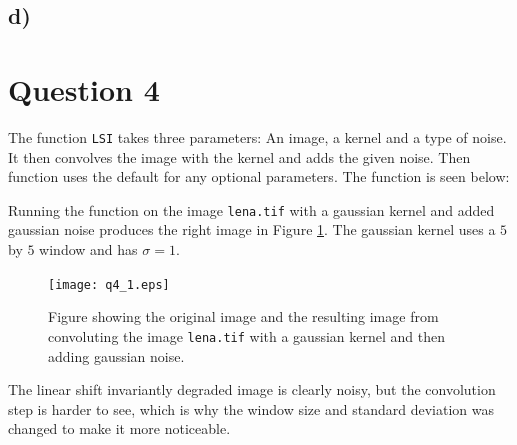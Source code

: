 \documentclass[a4paper]{article}
\begin{document}
\subsection*{d)}

\section{Question 4}
The function \texttt{LSI} takes three parameters: An image, a kernel and a type of noise. It then convolves the image with the kernel and adds the given noise. Then function uses the default for any optional parameters. The function is seen below:

Running the function on the image \texttt{lena.tif} with a gaussian kernel and added gaussian noise produces the right image in Figure \ref{q4_1}. The gaussian kernel uses a $5$ by $5$ window and has $\sigma=1$.
\begin{figure}[H]
  \centering
  \captionsetup{justification=centering}
\texttt{[image: q4\_1.eps]}
\caption{Figure showing the original image and the resulting image from convoluting the image \texttt{lena.tif} with a gaussian kernel and then adding gaussian noise.}
  \label{q4_1}
\end{figure}
The linear shift invariantly degraded image is clearly noisy, but the convolution step is harder to see, which is why the window size and standard deviation was changed to make it more noticeable.
\end{document}
